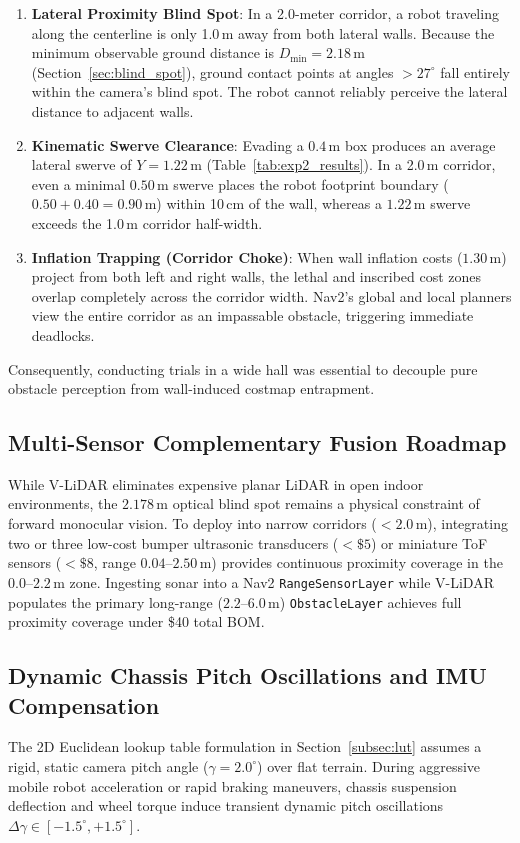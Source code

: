 \documentclass{ieeeaccess}
\begin{document}
\begin{enumerate}
  \item \textbf{Lateral Proximity Blind Spot}: In a 2.0-meter corridor, a robot traveling along the centerline is only 1.0\,m away from both lateral walls. Because the minimum observable ground distance is $D_{\min} = 2.18$\,m (Section~\ref{sec:blind_spot}), ground contact points at angles $> 27^\circ$ fall entirely within the camera's blind spot. The robot cannot reliably perceive the lateral distance to adjacent walls.
  \item \textbf{Kinematic Swerve Clearance}: Evading a $0.4$\,m box produces an average lateral swerve of $Y = 1.22$\,m (Table~\ref{tab:exp2_results}). In a 2.0\,m corridor, even a minimal $0.50$\,m swerve places the robot footprint boundary ($0.50 + 0.40 = 0.90$\,m) within 10\,cm of the wall, whereas a $1.22$\,m swerve exceeds the 1.0\,m corridor half-width.
  \item \textbf{Inflation Trapping (Corridor Choke)}: When wall inflation costs ($1.30$\,m) project from both left and right walls, the lethal and inscribed cost zones overlap completely across the corridor width. Nav2's global and local planners view the entire corridor as an impassable obstacle, triggering immediate deadlocks.
\end{enumerate}
Consequently, conducting trials in a wide hall was essential to decouple pure obstacle perception from wall-induced costmap entrapment.

\subsection{Multi-Sensor Complementary Fusion Roadmap}
\label{subsec:sensor_fusion_roadmap}
While V-LiDAR eliminates expensive planar LiDAR in open indoor environments, the $2.178$\,m optical blind spot remains a physical constraint of forward monocular vision. To deploy into narrow corridors ($<2.0$\,m), integrating two or three low-cost bumper ultrasonic transducers ($<\$5$) or miniature ToF sensors ($<\$8$, range $0.04\text{--}2.50$\,m) provides continuous proximity coverage in the $0.0\text{--}2.2$\,m zone. Ingesting sonar into a Nav2 \texttt{RangeSensorLayer} while V-LiDAR populates the primary long-range ($2.2\text{--}6.0$\,m) \texttt{ObstacleLayer} achieves full proximity coverage under \$40 total BOM.

\subsection{Dynamic Chassis Pitch Oscillations and IMU Compensation}
\label{subsec:dynamic_pitch}
The 2D Euclidean lookup table formulation in Section~\ref{subsec:lut} assumes a rigid, static camera pitch angle ($\gamma = 2.0^\circ$) over flat terrain. During aggressive mobile robot acceleration or rapid braking maneuvers, chassis suspension deflection and wheel torque induce transient dynamic pitch oscillations $\Delta \gamma \in [-1.5^\circ, +1.5^\circ]$. 
\end{document}
